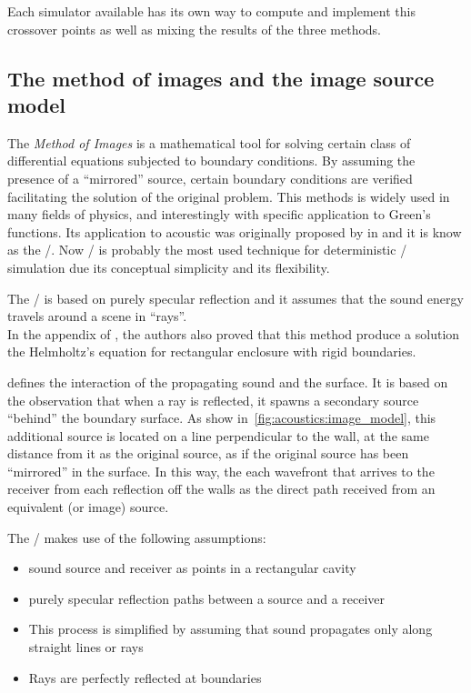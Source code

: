 Each simulator available has its own way to compute and implement this crossover points as well as mixing the results of the three methods.

\subsection{The method of images and the image source model}\label{subsec:acoustics:ism}
The \textit{Method of Images} is a mathematical tool for solving certain class of differential equations subjected to boundary conditions.
By assuming the presence of a ``mirrored'' source, certain boundary conditions are verified facilitating the solution of the original problem.
This methods is widely used in many fields of physics, and interestingly with specific application to Green's functions.
Its application to acoustic was originally proposed by \citeauthor{allen1979image} in  and it is know as the \ISMdef/.
Now \ISM/ is probably the most used technique for deterministic \RIR/ simulation due its conceptual simplicity and its flexibility.

The \ISM/ is based on purely specular reflection and it assumes that the sound energy travels around a scene in ``rays''.
\\In the appendix of , the authors also proved that this method produce a solution the Helmholtz's equation
for rectangular enclosure with rigid boundaries.

 defines the interaction of the propagating sound and the surface.
It is based on the observation that when a ray is reflected, it spawns a secondary source ``behind'' the boundary surface.
As show in~\cref{fig:acoustics:image_model}, this additional source is located on a line perpendicular to the wall, at the same distance from it as the original source, as if the original source has been “mirrored” in the surface.
In this way, the each wavefront that arrives to the receiver from each reflection off the walls as the direct path received from an equivalent (or image) source.

The \ISM/ makes use of the following assumptions:
\begin{itemize}
    \item sound source and receiver as points in a rectangular cavity
    \item purely specular reflection paths between a source and a receiver
    \item This process is simplified by assuming that sound propagates only along straight lines or rays
    \item Rays are perfectly reflected at boundaries
\end{itemize}

